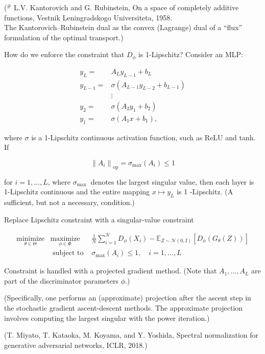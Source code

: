\documentclass{report}
\begin{document}
\begin{definition}[21.29][WGAN]
    ($^{\#}$ L.V. Kantorovich and G. Rubinstein, On a space of completely additive functions, Vestnik Leningradskogo Universiteta, 1958.\\
    The Kantorovich–Rubinstein dual as the convex (Lagrange) dual of a “flux” formulation of the optimal transport.)
\end{definition}

\begin{concept}
    How do we enforce the constraint that $D_{\phi}$ is 1-Lipschitz? Consider an MLP:

    $$
    \begin{aligned}
    y_{L}= & A_{L} y_{L-1}+b_{L} \\
    y_{L-1}= & \sigma\left(A_{L-1} y_{L-2}+b_{L-1}\right) \\
    & \vdots \\
    y_{2}= & \sigma\left(A_{2} y_{1}+b_{2}\right) \\
    y_{1}= & \sigma\left(A_{1} x+b_{1}\right),
    \end{aligned}
    $$

    where $\sigma$ is a 1-Lipschitz continuous activation function, such as ReLU and tanh. If

    $$
    \left\|A_{i}\right\|_{\mathrm{op}}=\sigma_{\max }\left(A_{i}\right) \leq 1
    $$

    for $i=1, \ldots, L$, where $\sigma_{\text {max }}$ denotes the largest singular value, then each layer is 1-Lipschitz continuous and the entire mapping $x \mapsto y_{L}$ is 1 -Lipschitz. (A sufficient, but not a necessary, condition.)

    Replace Lipschitz constraint with a singular-value constraint

    $$
    \begin{array}{rll}
    \underset{\theta \in \Theta}{\operatorname{minimize}} & \underset{\phi \in \Phi}{\operatorname{maximize}} & \frac{1}{N} \sum_{i=1}^{N} D_{\phi}\left(X_{i}\right)-\mathbb{E}_{Z \sim \mathcal{N}(0, I)}\left[D_{\phi}\left(G_{\theta}(Z)\right)\right] \\
    & \text { subject to } & \sigma_{\max }\left(A_{i}\right) \leq 1, \quad i=1, \ldots, L
    \end{array}
    $$

    Constraint is handled with a projected gradient method. (Note that $A_{1}, \ldots, A_{L}$ are part of the discriminator parameters $\phi$.)

    (Specifically, one performs an (approximate) projection after the ascent step in the stochastic gradient ascent-descent methods. The approximate projection involves computing the largest singular with the power iteration.)

    (T. Miyato, T. Kataoka, M. Koyama, and Y. Yoshida, Spectral normalization for generative adversarial networks, ICLR, 2018.)
\end{concept}
\end{document}
